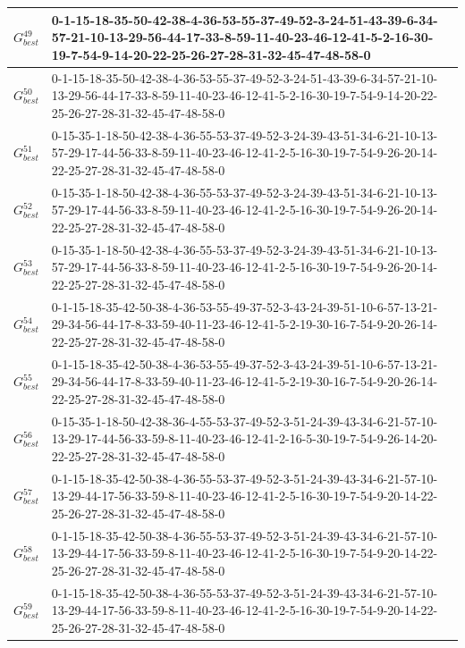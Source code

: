 \begin{landscape}
{\begin{tabularx}{\linewidth}{|c|X|}
        $G_{best}^{49}$  & 0-1-15-18-35-50-42-38-4-36-53-55-37-49-52-3-24-51-43-39-6-34-57-21-10-13-29-56-44-17-33-8-59-11-40-23-46-12-41-5-2-16-30-19-7-54-9-14-20-22-25-26-27-28-31-32-45-47-48-58-0 \\ \hline
        $G_{best}^{50}$  & 0-1-15-18-35-50-42-38-4-36-53-55-37-49-52-3-24-51-43-39-6-34-57-21-10-13-29-56-44-17-33-8-59-11-40-23-46-12-41-5-2-16-30-19-7-54-9-14-20-22-25-26-27-28-31-32-45-47-48-58-0 \\ \hline
        $G_{best}^{51}$  & 0-15-35-1-18-50-42-38-4-36-55-53-37-49-52-3-24-39-43-51-34-6-21-10-13-57-29-17-44-56-33-8-59-11-40-23-46-12-41-2-5-16-30-19-7-54-9-26-20-14-22-25-27-28-31-32-45-47-48-58-0 \\ \hline
        $G_{best}^{52}$  & 0-15-35-1-18-50-42-38-4-36-55-53-37-49-52-3-24-39-43-51-34-6-21-10-13-57-29-17-44-56-33-8-59-11-40-23-46-12-41-2-5-16-30-19-7-54-9-26-20-14-22-25-27-28-31-32-45-47-48-58-0 \\ \hline
        $G_{best}^{53}$  & 0-15-35-1-18-50-42-38-4-36-55-53-37-49-52-3-24-39-43-51-34-6-21-10-13-57-29-17-44-56-33-8-59-11-40-23-46-12-41-2-5-16-30-19-7-54-9-26-20-14-22-25-27-28-31-32-45-47-48-58-0 \\ \hline
        $G_{best}^{54}$  & 0-1-15-18-35-42-50-38-4-36-53-55-49-37-52-3-43-24-39-51-10-6-57-13-21-29-34-56-44-17-8-33-59-40-11-23-46-12-41-5-2-19-30-16-7-54-9-20-26-14-22-25-27-28-31-32-45-47-48-58-0 \\ \hline
        $G_{best}^{55}$  & 0-1-15-18-35-42-50-38-4-36-53-55-49-37-52-3-43-24-39-51-10-6-57-13-21-29-34-56-44-17-8-33-59-40-11-23-46-12-41-5-2-19-30-16-7-54-9-20-26-14-22-25-27-28-31-32-45-47-48-58-0 \\ \hline
        $G_{best}^{56}$  & 0-15-35-1-18-50-42-38-36-4-55-53-37-49-52-3-51-24-39-43-34-6-21-57-10-13-29-17-44-56-33-59-8-11-40-23-46-12-41-2-16-5-30-19-7-54-9-26-14-20-22-25-27-28-31-32-45-47-48-58-0 \\ \hline
        $G_{best}^{57}$  & 0-1-15-18-35-42-50-38-4-36-55-53-37-49-52-3-51-24-39-43-34-6-21-57-10-13-29-44-17-56-33-59-8-11-40-23-46-12-41-2-5-16-30-19-7-54-9-20-14-22-25-26-27-28-31-32-45-47-48-58-0 \\ \hline
        $G_{best}^{58}$  & 0-1-15-18-35-42-50-38-4-36-55-53-37-49-52-3-51-24-39-43-34-6-21-57-10-13-29-44-17-56-33-59-8-11-40-23-46-12-41-2-5-16-30-19-7-54-9-20-14-22-25-26-27-28-31-32-45-47-48-58-0 \\ \hline
        $G_{best}^{59}$  & 0-1-15-18-35-42-50-38-4-36-55-53-37-49-52-3-51-24-39-43-34-6-21-57-10-13-29-44-17-56-33-59-8-11-40-23-46-12-41-2-5-16-30-19-7-54-9-20-14-22-25-26-27-28-31-32-45-47-48-58-0 \\ \hline

\end{tabularx}}
\end{landscape}
